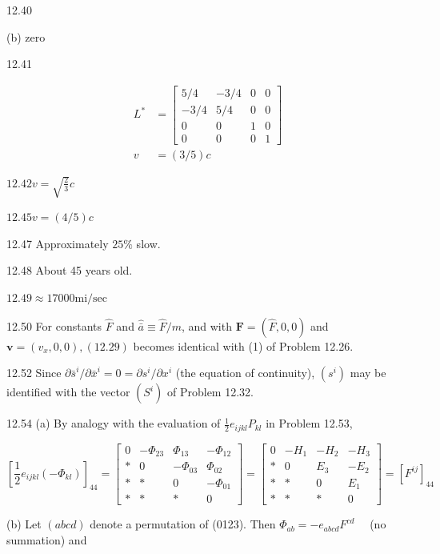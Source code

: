 \documentclass[10pt]{article}
\begin{document}
12.40

(b) zero

12.41

$$
\begin{aligned}
L^{*} & =\left[\begin{array}{cccc}
5 / 4 & -3 / 4 & 0 & 0 \\
-3 / 4 & 5 / 4 & 0 & 0 \\
0 & 0 & 1 & 0 \\
0 & 0 & 0 & 1
\end{array}\right] \\
v & =(3 / 5) c
\end{aligned}
$$

$12.42 v=\sqrt{\frac{2}{3}} c$

$12.45 v=(4 / 5) c$

12.47 Approximately $25 \%$ slow.

12.48 About 45 years old.

$12.49 \approx 17000 \mathrm{mi} / \mathrm{sec}$

12.50 For constants $\hat{F}$ and $\hat{\bar{a}} \equiv \hat{F} / m$, and with $\mathbf{F}=(\hat{F}, 0,0)$ and $\mathbf{v}=\left(v_{x}, 0,0\right),(12.29)$ becomes identical with (1) of Problem 12.26.

12.52 Since $\partial \bar{s}^{i} / \partial \bar{x}^{i}=0=\partial s^{i} / \partial x^{i}$ (the equation of continuity), $\left(s^{i}\right)$ may be identified with the vector $\left(S^{i}\right)$ of Problem 12.32.

12.54 (a) By analogy with the evaluation of $\frac{1}{2} e_{i j k l} P_{k l}$ in Problem 12.53,

$$
\left[\frac{1}{2} e_{i j k l}\left(-\Phi_{k l}\right)\right]_{44}=\left[\begin{array}{cccc}
0 & -\Phi_{23} & \Phi_{13} & -\Phi_{12} \\
* & 0 & -\Phi_{03} & \Phi_{02} \\
* & * & 0 & -\Phi_{01} \\
* & * & * & 0
\end{array}\right]=\left[\begin{array}{cccc}
0 & -H_{1} & -H_{2} & -H_{3} \\
* & 0 & E_{3} & -E_{2} \\
* & * & 0 & E_{1} \\
* & * & * & 0
\end{array}\right]=\left[F^{i j}\right]_{44}
$$

(b) Let $(a b c d)$ denote a permutation of (0123). Then $\Phi_{a b}=-e_{a b c d} F^{c d} \quad$ (no summation) and
\end{document}
